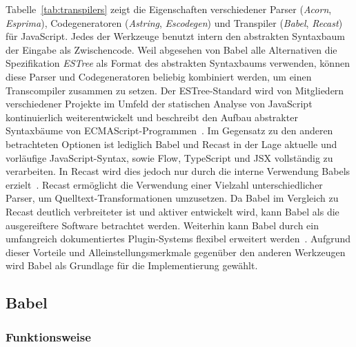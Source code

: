 Tabelle~\ref{tab:transpilers} zeigt die Eigenschaften verschiedener Parser (\textit{Acorn}, \textit{Esprima}), Codegeneratoren (\textit{Astring}, \textit{Escodegen}) und Transpiler (\textit{Babel}, \textit{Recast}) für JavaScript. Jedes der Werkzeuge benutzt intern den abstrakten Syntaxbaum der Eingabe als Zwischencode. Weil abgesehen von Babel alle Alternativen die Spezifikation \textit{ESTree} als Format des abstrakten Syntaxbaums verwenden, können diese Parser und Codegeneratoren beliebig kombiniert werden, um einen Transcompiler zusammen zu setzen. Der ESTree-Standard wird von Mitgliedern verschiedener Projekte im Umfeld der statischen Analyse von JavaScript kontinuierlich weiterentwickelt und beschreibt den Aufbau abstrakter Syntaxbäume von ECMAScript-Programmen~\autocite{BABEL:PARSER,ESTREE_SPEC}.
Im Gegensatz zu den anderen betrachteten Optionen ist lediglich Babel und Recast in der Lage aktuelle und vorläufige JavaScript-Syntax, sowie Flow, TypeScript und JSX vollständig zu verarbeiten. In Recast wird dies jedoch nur durch die interne Verwendung Babels erzielt~\autocite{RECAST}. Recast ermöglicht die Verwendung einer Vielzahl unterschiedlicher Parser, um Quelltext-Transformationen umzusetzen. Da Babel im Vergleich zu Recast deutlich verbreiteter ist und aktiver entwickelt wird, kann Babel als die ausgereiftere Software betrachtet werden. Weiterhin kann Babel durch ein umfangreich dokumentiertes Plugin-Systems flexibel erweitert werden~\autocite{BABEL:HANDBOOK}. Aufgrund dieser Vorteile und Alleinstellungsmerkmale gegenüber den anderen Werkzeugen wird Babel als Grundlage für die Implementierung gewählt.





\subsection{Babel}
\label{sec:babel}

\subsubsection{Funktionsweise}

